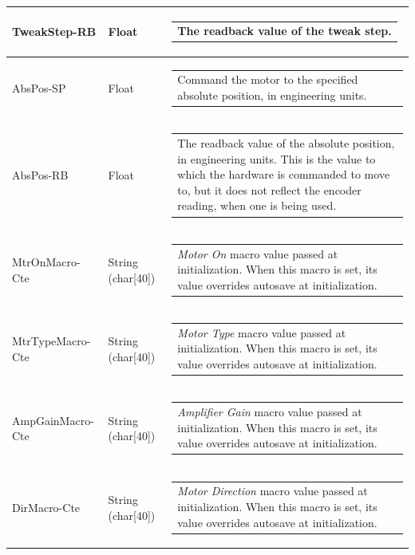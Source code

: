 \documentclass[openany]{article}
\begin{document}
\begin{longtable}{| m{4.5cm} m{2.5cm}  m{8.5cm} |}
        TweakStep-RB & Float & \begin{tabular}{@{}m{6cm}@{}}
                The readback value of the tweak step.
            \end{tabular} \hypertarget{pv:abs-pos}{}\\ \hline
        AbsPos-SP & Float & \begin{tabular}{@{}m{6cm}@{}}
                Command the motor to the specified absolute position, in engineering units.
            \end{tabular} \hypertarget{}{}\\ \hline
        AbsPos-RB & Float & \begin{tabular}{@{}m{6cm}@{}}
                The readback value of the absolute position, in engineering units. This is the value to which the hardware is commanded to move to, but it does not reflect the encoder reading, when one is being used.
            \end{tabular} \hypertarget{pv:mtr-on-macro-cte}{}\\ \hline
        MtrOnMacro-Cte & String (char[40]) & \begin{tabular}{@{}m{6cm}@{}}
                \emph{Motor On} macro value passed at initialization. When this macro is set, its value overrides autosave at initialization.
            \end{tabular} \hypertarget{pv:mtr-type-macro-cte}{}\\ \hline
        MtrTypeMacro-Cte & String (char[40]) & \begin{tabular}{@{}m{6cm}@{}}
                \emph{Motor Type} macro value passed at initialization. When this macro is set, its value overrides autosave at initialization.
            \end{tabular} \hypertarget{pv:amp-gain-macro-cte}{}\\ \hline
        AmpGainMacro-Cte & String (char[40]) & \begin{tabular}{@{}m{6cm}@{}}
                \emph{Amplifier Gain} macro value passed at initialization. When this macro is set, its value overrides autosave at initialization.
            \end{tabular} \hypertarget{pv:dir-macro-cte}{}\\ \hline
        DirMacro-Cte & String (char[40]) & \begin{tabular}{@{}m{6cm}@{}}
                \emph{Motor Direction} macro value passed at initialization. When this macro is set, its value overrides autosave at initialization.

\end{tabular}
\end{longtable}
\end{document}
